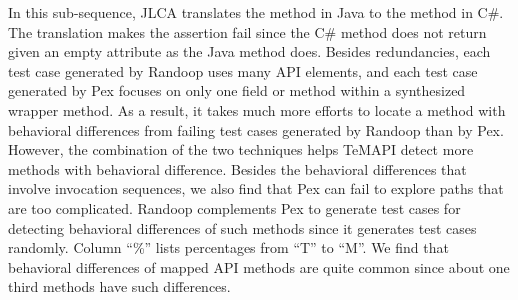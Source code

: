 In this sub-sequence, JLCA translates the  method in Java to the  method in C\#. The translation makes the assertion fail since the C\# method does not return  given an empty attribute as the Java method does. Besides redundancies, each test case generated by Randoop uses many API elements, and each test case generated by Pex focuses on only one field or method within a synthesized wrapper method. As a result, it takes much more efforts to locate a method with behavioral differences from failing test cases generated by Randoop than by Pex. However, the combination of the two techniques helps TeMAPI detect more methods with behavioral difference. Besides the behavioral differences that involve invocation sequences, we also find that Pex can fail to explore paths that are too complicated. Randoop complements Pex to generate test cases for detecting behavioral differences of such methods since it generates test cases randomly. Column ``\%'' lists percentages from ``T'' to ``M''. We find that behavioral differences of mapped API methods are quite common since about one third methods have such differences.

